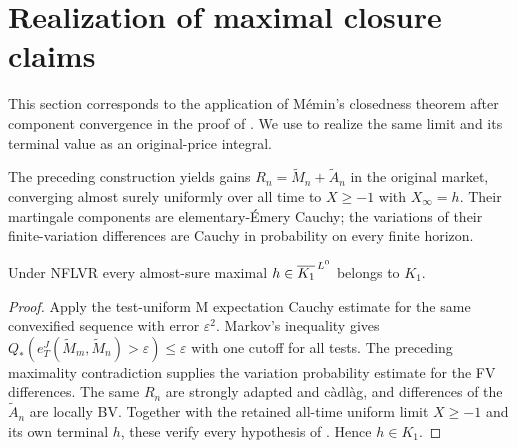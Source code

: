 \section{Realization of maximal closure claims}\label{sec:realization}
This section corresponds to the application of M\'emin's closedness theorem after component convergence in the proof of \cite[Theorem 4.2]{DS}. We use  to realize the same limit and its terminal value as an original-price integral.

The preceding construction yields gains $R_n=\widetilde M_n+\widetilde A_n$
in the original market, converging almost surely uniformly over all time to
$X\geq-1$ with $X_\infty=h$. Their martingale components are elementary-Émery
Cauchy; the variations of their finite-variation differences are Cauchy in
probability on every finite horizon.
\begin{theorem}\label{prop:realization}
Under NFLVR every almost-sure maximal $h\in\overline{K_1}^{\,L^0}$ belongs to $K_1$.
\end{theorem}
\begin{proof}
Apply the test-uniform M expectation Cauchy estimate for the same convexified sequence with error $\varepsilon^2$.
Markov's inequality gives $Q_*(e_T^J(\widetilde M_m,\widetilde M_n)>\varepsilon)\leq\varepsilon$ with one cutoff for all tests.
The preceding maximality contradiction supplies the variation probability estimate for the FV differences.
The same $R_n$ are strongly adapted and c\`adl\`ag, and differences of the $\widetilde A_n$ are locally BV.
Together with the retained all-time uniform limit $X\geq-1$ and its own terminal $h$, these verify every hypothesis of .
Hence $h\in K_1$.
\end{proof}
